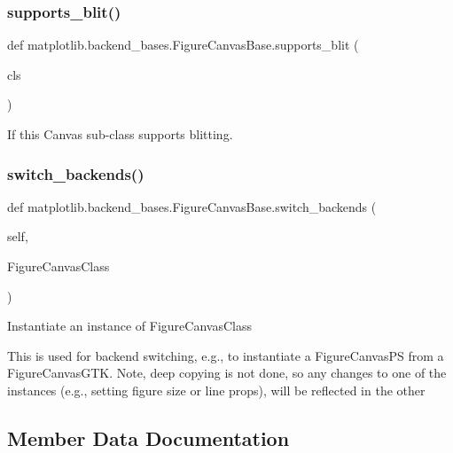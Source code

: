 \subsubsection{\texorpdfstring{supports\+\_\+blit()}{supports\_blit()}}
{\footnotesize\ttfamily def matplotlib.\+backend\+\_\+bases.\+Figure\+Canvas\+Base.\+supports\+\_\+blit (\begin{DoxyParamCaption}\item[{}]{cls }\end{DoxyParamCaption})}

\begin{DoxyVerb}If this Canvas sub-class supports blitting.\end{DoxyVerb}
 \mbox{\label{classmatplotlib_1_1backend__bases_1_1FigureCanvasBase_a8bdc9749f4f279b76259e5b956224ccd}} 
\subsubsection{\texorpdfstring{switch\+\_\+backends()}{switch\_backends()}}
{\footnotesize\ttfamily def matplotlib.\+backend\+\_\+bases.\+Figure\+Canvas\+Base.\+switch\+\_\+backends (\begin{DoxyParamCaption}\item[{}]{self,  }\item[{}]{Figure\+Canvas\+Class }\end{DoxyParamCaption})}

\begin{DoxyVerb}Instantiate an instance of FigureCanvasClass

This is used for backend switching, e.g., to instantiate a
FigureCanvasPS from a FigureCanvasGTK.  Note, deep copying is
not done, so any changes to one of the instances (e.g., setting
figure size or line props), will be reflected in the other
\end{DoxyVerb}
 

\subsection{Member Data Documentation}
\mbox{\label{classmatplotlib_1_1backend__bases_1_1FigureCanvasBase_a4d60d691efe79829ecbbe1aab9be7352}} 
